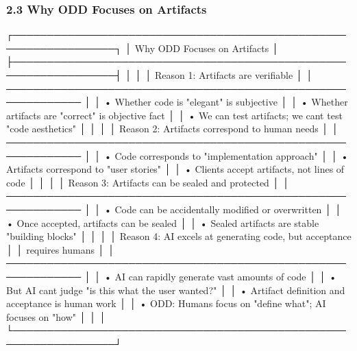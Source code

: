 \documentclass[
]{article}
\newenvironment{Shaded}{}{}
\newcommand{\NormalTok}[1]{#1}
\begin{document}
\hypertarget{23-why-odd-focuses-on-artifacts}{%
\subsubsection{2.3 Why ODD Focuses on
Artifacts}\label{23-why-odd-focuses-on-artifacts}}

\begin{Shaded}
\begin{Highlighting}[]
\NormalTok{┌─────────────────────────────────────────────────────────────────┐}
\NormalTok{│                Why ODD Focuses on Artifacts                      │}
\NormalTok{├─────────────────────────────────────────────────────────────────┤}
\NormalTok{│                                                                  │}
\NormalTok{│  Reason 1: Artifacts are verifiable                             │}
\NormalTok{│  ─────────────────────────────────────────────────────────────  │}
\NormalTok{│  • Whether code is "elegant" is subjective                      │}
\NormalTok{│  • Whether artifacts are "correct" is objective fact            │}
\NormalTok{│  • We can test artifacts; we can\textquotesingle{}t test "code aesthetics"       │}
\NormalTok{│                                                                  │}
\NormalTok{│  Reason 2: Artifacts correspond to human needs                  │}
\NormalTok{│  ─────────────────────────────────────────────────────────────  │}
\NormalTok{│  • Code corresponds to "implementation approach"                │}
\NormalTok{│  • Artifacts correspond to "user stories"                       │}
\NormalTok{│  • Clients accept artifacts, not lines of code                  │}
\NormalTok{│                                                                  │}
\NormalTok{│  Reason 3: Artifacts can be sealed and protected                │}
\NormalTok{│  ─────────────────────────────────────────────────────────────  │}
\NormalTok{│  • Code can be accidentally modified or overwritten             │}
\NormalTok{│  • Once accepted, artifacts can be sealed                       │}
\NormalTok{│  • Sealed artifacts are stable "building blocks"                │}
\NormalTok{│                                                                  │}
\NormalTok{│  Reason 4: AI excels at generating code, but acceptance         │}
\NormalTok{│           requires humans                                        │}
\NormalTok{│  ─────────────────────────────────────────────────────────────  │}
\NormalTok{│  • AI can rapidly generate vast amounts of code                 │}
\NormalTok{│  • But AI can\textquotesingle{}t judge "is this what the user wanted?"           │}
\NormalTok{│  • Artifact definition and acceptance is human work             │}
\NormalTok{│  • ODD: Humans focus on "define what"; AI focuses on "how"      │}
\NormalTok{│                                                                  │}
\NormalTok{└─────────────────────────────────────────────────────────────────┘}
\end{Highlighting}
\end{Shaded}
\end{document}
